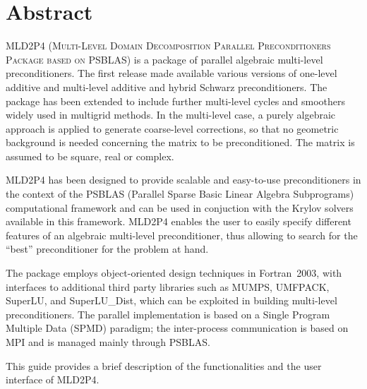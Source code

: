 \section*{Abstract}
\textsc{MLD2P4 (Multi-Level Domain Decomposition Parallel Preconditioners Package based on
PSBLAS}) is a package of parallel algebraic multi-level preconditioners.
The first release made available various versions of 
one-level additive and multi-level additive
and hybrid Schwarz preconditioners. 
The package has been extended to include further multi-level cycles and smoothers widely used in 
multigrid methods.
In the multi-level case, a purely algebraic approach
is applied to generate coarse-level corrections, so that no geometric background is needed
concerning the matrix to be preconditioned. The matrix is assumed to be square, real
or complex. 

MLD2P4 has been designed to provide scalable and easy-to-use preconditioners in the
context of the PSBLAS (Parallel Sparse Basic Linear Algebra Subprograms)
computational framework and can be used in conjuction with the Krylov solvers
available in this framework. MLD2P4 enables the user to easily specify different features
of an algebraic multi-level preconditioner, thus allowing to search
for the ``best'' preconditioner for the problem at hand. 

The package employs object-oriented design techniques in
Fortran~2003, with interfaces to additional third party libraries 
such as MUMPS, UMFPACK, SuperLU, and SuperLU\_Dist, which
can be exploited in building multi-level preconditioners. The parallel
implementation is based on a Single Program Multiple Data (SPMD)
paradigm; the inter-process communication is based on MPI and
is managed mainly through PSBLAS.

This guide provides a brief description of the functionalities and
the user interface of MLD2P4.
